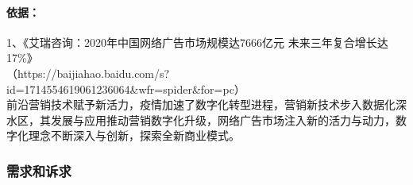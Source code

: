 \documentclass[a4paper]{ctexart}
\begin{document}
\begin{enumerate}[label=\alph*.]
  \paragraph{依据：}1、《艾瑞咨询：2020年中国网络广告市场规模达7666亿元 未来三年复合增长达17\%》\\（https://baijiahao.baidu.com/s?id=1714554619061236064\&wfr=spider\&for=pc）\\
  前沿营销技术赋予新活力，疫情加速了数字化转型进程，营销新技术步入数据化深水区，其发展与应用推动营销数字化升级，网络广告市场注入新的活力与动力，数字化理念不断深入与创新，探索全新商业模式。
\end{enumerate}

\subsubsection{需求和诉求}
\end{document}
